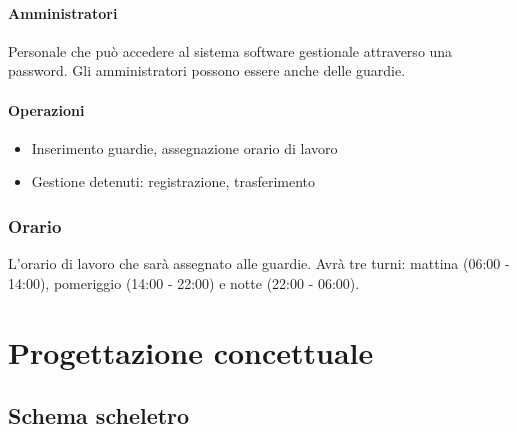 \documentclass[a4paper,12pt]{report}
\begin{document}
\subsubsection*{Amministratori}
Personale che può accedere al sistema software gestionale attraverso una password.
%
Gli amministratori possono essere anche delle guardie.
\subsubsection*{Operazioni}
\begin{itemize}
    \item Inserimento guardie, assegnazione orario di lavoro
    \item Gestione detenuti: registrazione, trasferimento
\end{itemize}
\subsection*{Orario}
L'orario di lavoro che sarà assegnato alle guardie.
%
Avrà tre turni: mattina (06:00 - 14:00), pomeriggio (14:00 - 22:00) e notte (22:00 - 06:00).
\chapter{Progettazione concettuale}
\section{Schema scheletro}
\end{document}
